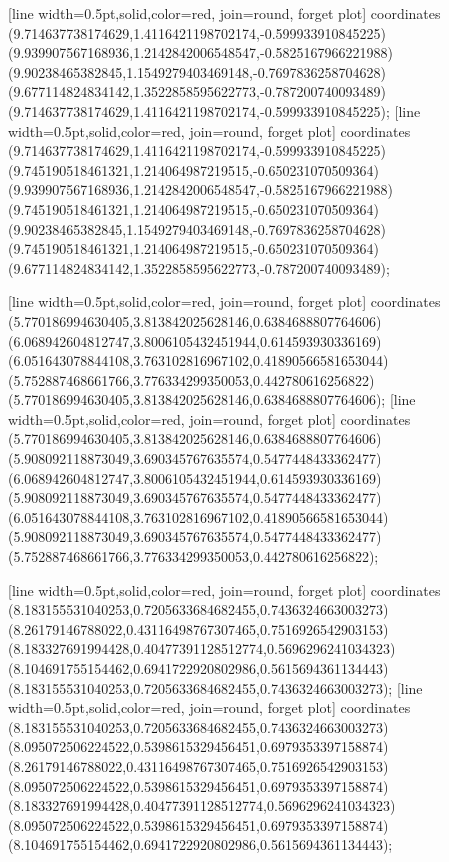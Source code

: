 [line width=0.5pt,solid,color=red, join=round, forget plot] coordinates {(9.714637738174629,1.4116421198702174,-0.599933910845225) (9.939907567168936,1.2142842006548547,-0.5825167966221988) (9.90238465382845,1.1549279403469148,-0.7697836258704628) (9.677114824834142,1.3522858595622773,-0.787200740093489) (9.714637738174629,1.4116421198702174,-0.599933910845225)};
[line width=0.5pt,solid,color=red, join=round, forget plot] coordinates {(9.714637738174629,1.4116421198702174,-0.599933910845225) (9.745190518461321,1.214064987219515,-0.650231070509364) (9.939907567168936,1.2142842006548547,-0.5825167966221988) (9.745190518461321,1.214064987219515,-0.650231070509364) (9.90238465382845,1.1549279403469148,-0.7697836258704628) (9.745190518461321,1.214064987219515,-0.650231070509364) (9.677114824834142,1.3522858595622773,-0.787200740093489)};

[line width=0.5pt,solid,color=red, join=round, forget plot] coordinates {(5.770186994630405,3.813842025628146,0.6384688807764606) (6.068942604812747,3.8006105432451944,0.614593930336169) (6.051643078844108,3.763102816967102,0.41890566581653044) (5.752887468661766,3.776334299350053,0.442780616256822) (5.770186994630405,3.813842025628146,0.6384688807764606)};
[line width=0.5pt,solid,color=red, join=round, forget plot] coordinates {(5.770186994630405,3.813842025628146,0.6384688807764606) (5.908092118873049,3.690345767635574,0.5477448433362477) (6.068942604812747,3.8006105432451944,0.614593930336169) (5.908092118873049,3.690345767635574,0.5477448433362477) (6.051643078844108,3.763102816967102,0.41890566581653044) (5.908092118873049,3.690345767635574,0.5477448433362477) (5.752887468661766,3.776334299350053,0.442780616256822)};

[line width=0.5pt,solid,color=red, join=round, forget plot] coordinates {(8.183155531040253,0.7205633684682455,0.7436324663003273) (8.26179146788022,0.43116498767307465,0.7516926542903153) (8.183327691994428,0.40477391128512774,0.5696296241034323) (8.104691755154462,0.6941722920802986,0.5615694361134443) (8.183155531040253,0.7205633684682455,0.7436324663003273)};
[line width=0.5pt,solid,color=red, join=round, forget plot] coordinates {(8.183155531040253,0.7205633684682455,0.7436324663003273) (8.095072506224522,0.5398615329456451,0.6979353397158874) (8.26179146788022,0.43116498767307465,0.7516926542903153) (8.095072506224522,0.5398615329456451,0.6979353397158874) (8.183327691994428,0.40477391128512774,0.5696296241034323) (8.095072506224522,0.5398615329456451,0.6979353397158874) (8.104691755154462,0.6941722920802986,0.5615694361134443)};

